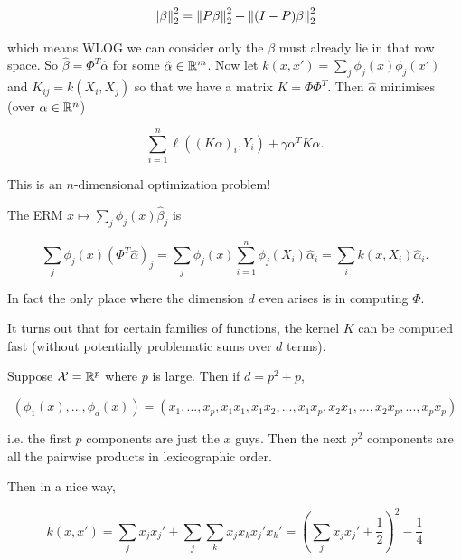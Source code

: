 \documentclass[11pt]{scrartcl}
\begin{document}
\begin{equation}
    \left\lVert\beta\right\rVert_2^2 = \left\lVert P\beta\right\rVert_2^2 + \left\lVert(I-P)\beta\right\rVert_2^2
\end{equation}

which means WLOG we can consider only the $\beta$ must already lie in that row space. So $\hat{\beta} = \Phi^T \hat{\alpha}$ for some $\hat{\alpha} \in \mathbb R^m$. Now let $k(x,x') = \sum_j \phi_j(x) \phi_j(x')$ and $K_{ij} = k(X_i,X_j)$ so that we have a  matrix $K = \Phi \Phi^T$. Then $\hat{\alpha}$ minimises (over $\alpha \in \mathbb R^n$)

\begin{equation}
    \sum_{i=1}^n \ell((K\alpha)_i, Y_i) + \gamma \alpha^T K \alpha.
\end{equation}

This is an $n$-dimensional optimization problem!

The ERM $x \mapsto \sum_j \phi_j (x) \hat{\beta}_j$ is

\begin{equation} 
    \sum_j \phi_j (x) (\Phi^T \hat{\alpha})_j = \sum_j \phi_j(x) \sum_{i=1}^n \phi_j(X_i) \hat{\alpha}_i = \sum_i k(x, X_i) \hat{\alpha}_i.
\end{equation}

In fact the only place where the dimension $d$ even arises is in computing $\Phi$.

It turns out that for certain families of functions, the kernel $K$ can be computed fast (without potentially problematic sums over $d$ terms).

\begin{example}

Suppose $\mathcal{X}= \mathbb R^p$ where $p$
is large. Then if $d=p^2+p$,

\begin{equation}
    (\phi_1(x), ... , \phi_d(x)) = (x_1, ... , x_p, x_1x_1, x_1x_2, ... , x_1x_p, x_2x_1, ... , x_2x_p, ... , x_px_p)
\end{equation}

i.e. the first $p$ components are just the $x$ guys. Then the next $p^2$ components are all the pairwise products in lexicographic order.

Then in a nice way,

\begin{equation}
    k(x, x') = \sum_j x_j x_j' + \sum_j \sum_k x_j x_k x_j' x_k' = \left( \sum_j x_j x_j' + \frac12 \right)^2 - \frac14
\end{equation}
\end{example}
\end{document}

